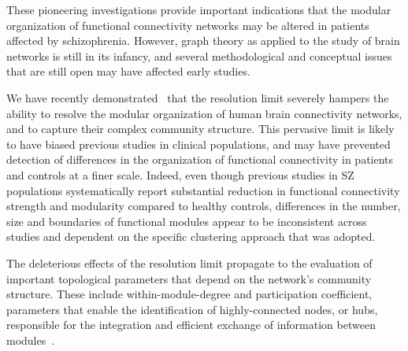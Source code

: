 These pioneering investigations provide important indications that the modular organization of functional connectivity networks may be altered in patients affected by schizophrenia.
However, graph theory as applied to the study of brain networks is still in its infancy, and several methodological and conceptual issues that are still open may have affected early studies.

We have recently demonstrated~\cite{nicolini2016,nicolini2017} that the resolution limit severely hampers the ability to resolve the modular organization of human brain connectivity networks, and to capture their complex community structure.
This pervasive limit is likely to have biased previous studies in clinical populations, and may have prevented detection of differences in the organization of functional connectivity in patients and controls at a finer scale.
Indeed, even though previous studies in SZ populations systematically report substantial reduction in functional connectivity strength and modularity compared to healthy controls, differences in the number, size and boundaries of functional modules appear to be inconsistent across studies and dependent on the specific clustering approach that was adopted.

The deleterious effects of the resolution limit propagate to the evaluation of important topological parameters that depend on the network's community structure.
These include within-module-degree and participation coefficient, parameters that enable the identification of highly-connected nodes, or hubs, responsible for the integration and efficient exchange of information between modules~\cite{bullmore2009}.


